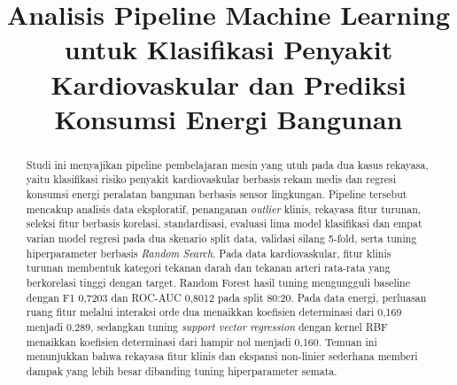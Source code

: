 \documentclass[conference]{IEEEtran}
\begin{document}
\renewcommand{\tablename}{Tabel}
\renewcommand{\figurename}{Gambar}
\renewcommand{\abstractname}{Abstrak}
\def\IEEEkeywordsname{Kata Kunci}

\title{Analisis Pipeline Machine Learning untuk Klasifikasi Penyakit Kardiovaskular dan Prediksi Konsumsi Energi Bangunan}

\author{
\and
{}
}

\maketitle

\begin{abstract}
Studi ini menyajikan pipeline pembelajaran mesin yang utuh pada dua kasus rekayasa, yaitu klasifikasi risiko penyakit kardiovaskular berbasis rekam medis dan regresi konsumsi energi peralatan bangunan berbasis sensor lingkungan. Pipeline tersebut mencakup analisis data eksploratif, penanganan \textit{outlier} klinis, rekayasa fitur turunan, seleksi fitur berbasis korelasi, standardisasi, evaluasi lima model klasifikasi dan empat varian model regresi pada dua skenario split data, validasi silang 5-fold, serta tuning hiperparameter berbasis \textit{Random Search}. Pada data kardiovaskular, fitur klinis turunan membentuk kategori tekanan darah dan tekanan arteri rata-rata yang berkorelasi tinggi dengan target. Random Forest hasil tuning mengungguli baseline dengan F1 0{,}7203 dan ROC-AUC 0{,}8012 pada split 80:20. Pada data energi, perluasan ruang fitur melalui interaksi orde dua menaikkan koefisien determinasi dari 0{,}169 menjadi 0{,}289, sedangkan tuning \textit{support vector regression} dengan kernel RBF menaikkan koefisien determinasi dari hampir nol menjadi 0{,}160. Temuan ini menunjukkan bahwa rekayasa fitur klinis dan ekspansi non-linier sederhana memberi dampak yang lebih besar dibanding tuning hiperparameter semata.
\end{abstract}
\end{document}
